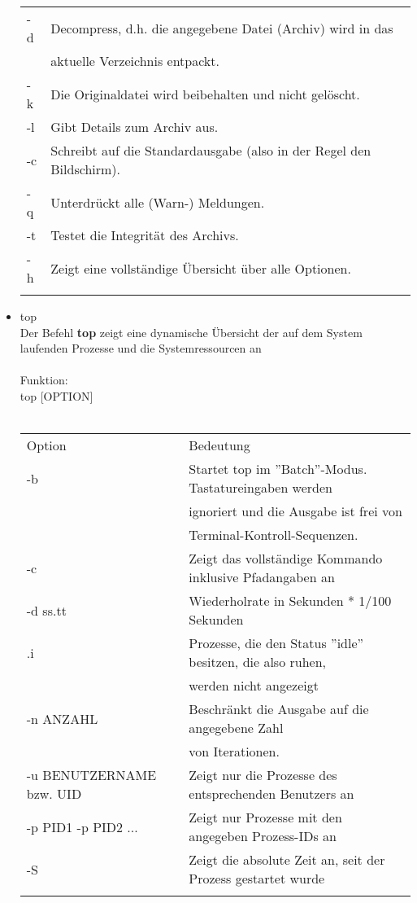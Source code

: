 \begin{itemize}
\begin{tabular}{ll}
				-d & Decompress, d.h. die angegebene Datei (Archiv) wird in das\\
				& aktuelle Verzeichnis entpackt.\\
				-k & Die Originaldatei wird beibehalten und nicht gel\"oscht.\\
				-l & Gibt Details zum Archiv aus.\\
				-c & Schreibt auf die Standardausgabe (also in der Regel den Bildschirm).\\
				-q & Unterdr\"uckt alle (Warn-) Meldungen.\\
				-t & Testet die Integrit\"at des Archivs.\\
				-h & Zeigt eine vollst\"andige \"Ubersicht über alle Optionen.\\ \\ 
			\end{tabular}
			\item top\\
			Der Befehl \textbf{top} zeigt eine dynamische \"Ubersicht der auf dem System laufenden Prozesse und die Systemressourcen an\\ \\
			Funktion:\\
			top [OPTION]\\ \\
			\begin{tabular}{ll}
				Option & Bedeutung \\
				-b & Startet top im ''Batch''-Modus. Tastatureingaben werden\\
				& ignoriert und die Ausgabe ist frei von\\
				& Terminal-Kontroll-Sequenzen.\\
				-c & Zeigt das vollst\"andige Kommando inklusive Pfadangaben an\\
				-d ss.tt & Wiederholrate in Sekunden * 1/100 Sekunden\\
				.i & Prozesse, die den Status ''idle'' besitzen, die also ruhen,\\
				& werden nicht angezeigt\\
				-n ANZAHL & Beschr\"ankt die Ausgabe auf die angegebene Zahl\\
				& von Iterationen.\\
				-u BENUTZERNAME bzw. UID & Zeigt nur die Prozesse des entsprechenden Benutzers an\\
				-p PID1 -p PID2 ... & Zeigt nur Prozesse mit den angegeben Prozess-IDs an\\
				-S & Zeigt die absolute Zeit an, seit der Prozess gestartet wurde\\ \\

\end{tabular}
\end{itemize}

